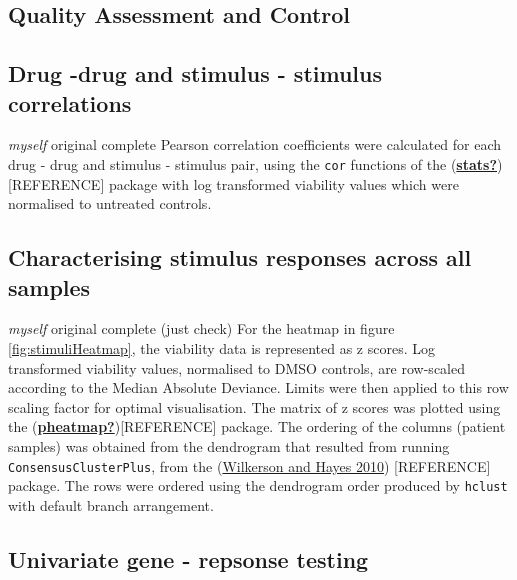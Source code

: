\documentclass[11pt, a4paper, twosided]{book}
\begin{document}
\hypertarget{quality-assessment-and-control}{%
\subsection{Quality Assessment and Control}\label{quality-assessment-and-control}}

\hypertarget{drug--drug-and-stimulus---stimulus-correlations}{%
\subsection{Drug -drug and stimulus - stimulus correlations}\label{drug--drug-and-stimulus---stimulus-correlations}}

\emph{myself} original complete
Pearson correlation coefficients were calculated for each drug - drug and stimulus - stimulus pair, using the \texttt{cor} functions of the (\protect\hyperlink{ref-stats}{\textbf{stats?}}){[}REFERENCE{]} package with log transformed viability values which were normalised to untreated controls.

\hypertarget{characterising-stimulus-responses-across-all-samples}{%
\subsection{Characterising stimulus responses across all samples}\label{characterising-stimulus-responses-across-all-samples}}

\emph{myself} original complete (just check)
For the heatmap in figure \ref{fig:stimuliHeatmap}, the viability data is represented as z scores. Log transformed viability values, normalised to DMSO controls, are row-scaled according to the Median Absolute Deviance. Limits were then applied to this row scaling factor for optimal visualisation. The matrix of z scores was plotted using the (\protect\hyperlink{ref-pheatmap}{\textbf{pheatmap?}}){[}REFERENCE{]} package. The ordering of the columns (patient samples) was obtained from the dendrogram that resulted from running \texttt{ConsensusClusterPlus}, from the (\protect\hyperlink{ref-ConsensusClusterPlus}{Wilkerson and Hayes 2010}) {[}REFERENCE{]} package. The rows were ordered using the dendrogram order produced by \texttt{hclust} with default branch arrangement.

\hypertarget{univariate-gene---repsonse-testing}{%
\subsection{Univariate gene - repsonse testing}\label{univariate-gene---repsonse-testing}}
\end{document}

